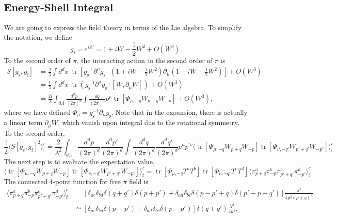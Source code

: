 \documentclass[aps,prb,superscriptaddress,nofootinbib]{revtex4}
\def \tr{\operatorname{tr}}
\begin{document}
\subsection{Energy-Shell Integral}
We are going to express the field theory in terms of the Lie algebra.
To simplify the notation, we define 
\begin{equation}
	g_{\mathrm{f}} = e^{iW} = 1 + i W - \frac{1}{2}W^2 + O(W^3).
\end{equation}
To the second order of $\pi$, the interacting action to the second order of $\pi$ is
\begin{equation}
\begin{aligned}
	S[g_{\mathrm{s}},g_{\mathrm{f}}] 
	&= \frac{2}{\lambda} \int d^d x\ \tr\left[g_{\mathrm{s}}^{-1}\partial^\mu g_{\mathrm{s}} \cdot \left(1+iW-\frac{1}{2}W^2\right) \partial_\mu \left(1-iW-\frac{1}{2}W^2\right)\right] +O(W^3)\\
	&= \frac{1}{\lambda} \int d^d x\ \tr\left(g_{\mathrm{s}}^{-1}\partial^\mu g_{\mathrm{s}} \cdot [W,\partial_\mu W]\right)+O(W^3) \\
	&= \frac{2i}{\lambda}\int_{d\Lambda} \frac{d^d p}{(2\pi)^d}\int\frac{dq}{(2\pi)^d} p^\mu \tr\left[\Phi_{\mu,-q}W_{p+q}W_{-p}\right]+O(W^3),
\end{aligned}
\end{equation}
where we have defined $\Phi_\mu = g_{\mathrm{s}}^{-1}\partial_\mu g_{\mathrm{s}}$.
Note that in the expansion, there is actually a linear term $\partial_\mu W$, which vanish upon integral due to the rotational symmetry.
To the second order,
\begin{equation}
	\frac{1}{2}\langle S[g_{\mathrm{s}},g_{\mathrm{f}}]^2\rangle_{\mathrm{f}}^c
	= \frac{2}{\lambda^2} \int_{d\Lambda}\frac{d^d p}{(2\pi)^d} \frac{d^d p'}{(2\pi)^d}\int\frac{d^d q}{(2\pi)^d}\frac{d^d q'}{(2\pi)^d} p^\mu p^{\prime\nu} 
	\langle \tr\left[\Phi_{\mu,-q}W_{p+q}W_{-p}\right]\tr\left[\Phi_{\nu,-q'}W_{p'+q'}W_{-p'}\right]\rangle^c_{\mathrm{f}}
\end{equation}
The next step is to evaluate the expectation value,
\begin{equation}
	\langle \tr\left[\Phi_{\mu,-q}W_{p+q}W_{-p}\right]\tr\left[\Phi_{\nu,-q'}W_{p'+q'}W_{-p'}\right]\rangle^c_{\mathrm{f}}
	=  \tr\left[\Phi_{\mu,-q}T^aT^b\right]\tr\left[\Phi_{\nu,-q'}T^c T^d\right]\langle\pi^a_{p+q}\pi^b_{-p}\pi^c_{p'+q'}\pi^d_{-p'}\rangle^c_{\mathrm{f}}
\end{equation}
The connected 4-point function for free $\pi$ field is
\begin{equation}
\begin{aligned}
	\langle\pi^a_{p+q}\pi^b_{-p}\pi^c_{p'+q'}\pi^d_{-p'}\rangle^c_{\mathrm{f}}
	&= \left[\delta_{ac}\delta_{bd}\delta(q+q')\delta(p+p') + \delta_{ad}\delta_{bc}\delta(p-p'+q)\delta(p'-p+q')\right]\frac{\lambda^2}{4p^2(p+q)^2} \\
	&\simeq [\delta_{ac}\delta_{bd}\delta(p+p')+\delta_{ad}\delta_{bc}\delta(p-p')]\delta(q+q')\frac{\lambda^2}{4p^4}.
\end{aligned}
\end{equation}
\end{document}

